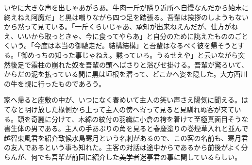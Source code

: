 \documentclass[12pt, openright]{book}
\begin{document}
いやに大きな声を出しゃあがらあ。牛肉一斤が隣り近所へ自慢なんだから始末に終えねえ阿魔だ」と黒は嘲りながら四つ足を踏張る。吾輩は挨拶のしようもないから黙って見ている。「一斤くらいじゃあ、承知が出来ねえんだが、仕方がねえ、いいから取っときゃ、今に食ってやらあ」と自分のために誂えたもののごとくいう。「今度は本当の御馳走だ。結構結構」と吾輩はなるべく彼を帰そうとする。「御めっちの知った事じゃねえ。黙っていろ。うるせえや」と云いながら突然後足で霜柱の崩れた奴を吾輩の頭へばさりと浴びせ掛ける。吾輩が驚ろいて、からだの泥を払っている間に黒は垣根を潜って、どこかへ姿を隠した。大方西川の牛を覘に行ったものであろう。

家へ帰ると座敷の中が、いつになく春めいて主人の笑い声さえ陽気に聞える。はてなと明け放した椽側から上って主人の傍へ寄って見ると見馴れぬ客が来ている。頭を奇麗に分けて、木綿の紋付の羽織に小倉の袴を着けて至極真面目そうな書生体の男である。主人の手あぶりの角を見ると春慶塗りの巻煙草入れと並んで越智東風君を紹介致候水島寒月という名刺があるので、この客の名前も、寒月君の友人であるという事も知れた。主客の対話は途中からであるから前後がよく分らんが、何でも吾輩が前回に紹介した美学者迷亭君の事に関しているらしい。
\end{document}
